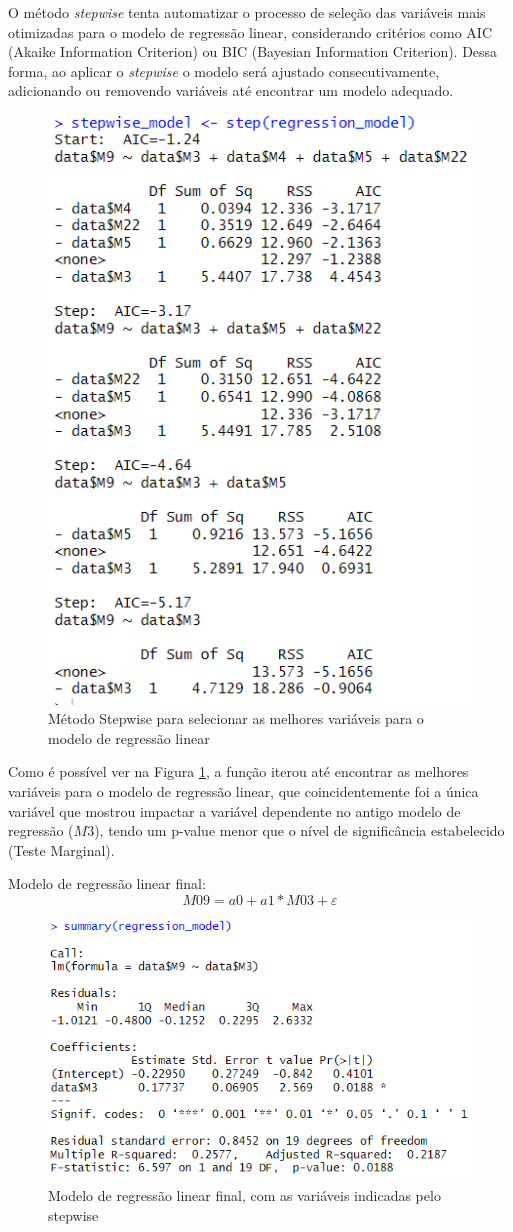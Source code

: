 \documentclass[%
 aip,
cp,  %
 amsmath,amssymb,%
 reprint,%
]{revtex4-2}
\begin{document}
O método \textit{stepwise} tenta automatizar o processo de seleção das variáveis mais otimizadas para o modelo de regressão linear, considerando critérios como AIC (Akaike Information Criterion) ou BIC (Bayesian Information Criterion). Dessa forma, ao aplicar o \textit{stepwise} o modelo será ajustado consecutivamente, adicionando ou removendo variáveis até encontrar um modelo adequado.

\begin{figure}[!h]
    \centering
    \includegraphics[width=0.5\linewidth]{imagens//questao3/StepWise.png}
    \caption{Método Stepwise para selecionar as melhores variáveis para o modelo de regressão linear}
    \label{fig:stepwiseMethod}
\end{figure}

Como é possível ver na Figura \ref{fig:stepwiseMethod}, a função iterou até encontrar as melhores variáveis para o modelo de regressão linear, que coincidentemente foi a única variável que mostrou impactar a variável dependente no antigo modelo de regressão ($M3$), tendo um p-value menor que o nível de significância estabelecido (Teste Marginal).

\vspace{0.5cm}
Modelo de regressão linear final: \[ M09 = a0 + a1*M03 + \varepsilon\]

\break

\begin{figure}[!h]
    \centering
    \includegraphics[width=0.6\linewidth]{imagens//questao3/regressaoLinearFinal.png}
    \caption{Modelo de regressão linear final, com as variáveis indicadas pelo stepwise}
    \label{fig:modelo_regressao_linear_final}
\end{figure}
\end{document}
